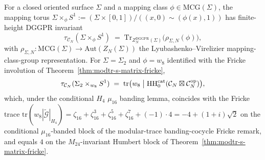 \begin{theorem}
\label{thm:modtr-rt-mapping-torus}
For a closed oriented surface $\Sigma$ and a mapping class
$\phi\in\mathrm{MCG}(\Sigma)$, the mapping torus
$\Sigma\times_\phi S^1 := (\Sigma\times [0,1])/((x, 0)\sim(\phi(x), 1))$
has finite-height DGGPR invariant
\[
 \tau_{\mathcal C_N}(\Sigma\times_\phi S^1)
 \;=\;
 \mathrm{Tr}_{Z^{\mathrm{DGGPR}}_N(\Sigma)}\!\bigl(\rho_{\Sigma,N}(\phi)\bigr),
\]
with \(\rho_{\Sigma,N}\colon\mathrm{MCG}(\Sigma)\to
\mathrm{Aut}(Z_N(\Sigma))\) the Lyubashenko--Virelizier
mapping-class-group representation. For
$\Sigma = \Sigma_2$ and $\phi = w_8$ identified with the Fricke
involution of Theorem~\ref{thm:modtr-s-matrix-fricke},
\[
 \tau_{\mathcal C_N}(\Sigma_2\times_{w_8} S^1)
 \;=\;
 \mathrm{tr}\bigl(w_8\bigm\vert\mathrm{HH}_0^{\mathrm{cat}}
 (\mathcal C_N\boxtimes\mathcal C_N^{\mathrm{op}})\bigr),
\]
which, under the conditional $H_4$ $\mu_{16}$ banding lemma, coincides with the Fricke trace
$\mathrm{tr}(w_8|\widetilde{\mathcal G}|_{H_4}) = \zeta_{16} +
\zeta_{16}^3 + \zeta_{16}^5 + \zeta_{16}^7 + (-1)\cdot 4
= -4 + (1+i)\sqrt 2$ on the conditional $\mu_{16}$-banded block of
the modular-trace banding-cocycle Fricke remark, and equals $4$
on the $M_{24}$-invariant Humbert block of
Theorem~\ref{thm:modtr-s-matrix-fricke}.
\end{theorem}

